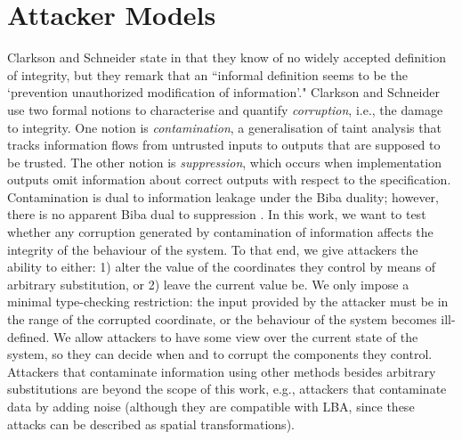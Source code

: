 \section{Attacker Models} 
Clarkson and Schneider state in \cite{QuantitativeIntegrity} that they know of no widely accepted definition of integrity, but they remark that an ``informal definition seems to be the `prevention unauthorized modification of information'." Clarkson and Schneider use two formal notions to characterise and quantify \emph{corruption}, i.e., the damage to integrity. One notion is \emph{contamination}, a generalisation of taint analysis that tracks information flows from untrusted inputs to outputs that are supposed to be trusted. The other notion is \emph{suppression}, which occurs when implementation outputs omit information about correct outputs with respect to the specification. Contamination is dual to information leakage under the Biba duality; however, there is no apparent Biba dual to suppression \cite{BibaIntegrity}. 
In this work, we want to test whether any corruption generated by contamination of information affects the integrity of the behaviour of the system. To that end, we %
give attackers the ability to either: 1) alter the value of the coordinates they control by means of arbitrary substitution, or 2) leave the current value be. We only impose a minimal type-checking restriction: the input provided by the attacker must be in the range of the corrupted coordinate, or the behaviour of the system becomes ill-defined. We allow attackers to have some view over the current state of the system, so they can decide when and to corrupt the components they control. Attackers that contaminate information using other methods besides arbitrary substitutions are beyond the scope of this work, e.g., attackers that contaminate data by adding noise (although they are compatible with LBA, since these attacks can be described as spatial transformations).  



